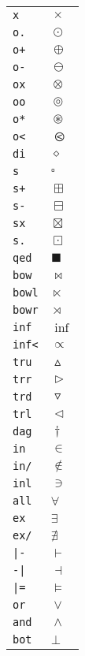 \begin{longtable}{ll}
\texttt{x}&${}\times {}$\\
\texttt{o.}&${}\odot {}$\\
\texttt{o+}&${}\oplus {}$\\
\texttt{o{-}}&${}\ominus {}$\\
\texttt{ox}&${}\otimes {}$\\
\texttt{oo}&${}\circledcirc {}$\\
\texttt{o*}&${}\circledast {}$\\
\texttt{o<}&${}\olessthan {}$\\
\texttt{di}&${}\diamond {}$\\
\texttt{s}&${}\square {}$\\
\texttt{s+}&${}\boxplus {}$\\
\texttt{s{-}}&${}\boxminus {}$\\
\texttt{sx}&${}\boxtimes {}$\\
\texttt{s.}&${}\boxdot {}$\\
\texttt{qed}&${}\blacksquare {}$\\
\texttt{bow}&${}\bowtie {}$\\
\texttt{bowl}&${}\ltimes {}$\\
\texttt{bowr}&${}\rtimes {}$\\
\texttt{inf}&${}\inf {}$\\
\texttt{inf<}&${}\propto {}$\\
\texttt{tru}&${}\vartriangle {}$\\
\texttt{trr}&${}\vartriangleright {}$\\
\texttt{trd}&${}\triangledown {}$\\
\texttt{trl}&${}\vartriangleleft {}$\\
\texttt{dag}&${}\dagger {}$\\
\texttt{in}&${}\in {}$\\
\texttt{in/}&${}\notin {}$\\
\texttt{inl}&${}\ni {}$\\
\texttt{all}&${}\forall {}$\\
\texttt{ex}&${}\exists {}$\\
\texttt{ex/}&${}\nexists {}$\\
\texttt{|{-}}&${}\vdash {}$\\
\texttt{{-}|}&${}\dashv {}$\\
\texttt{|=}&${}\models {}$\\
\texttt{or}&${}\vee {}$\\
\texttt{and}&${}\wedge {}$\\
\texttt{bot}&${}\bot {}$\\

\end{longtable}
